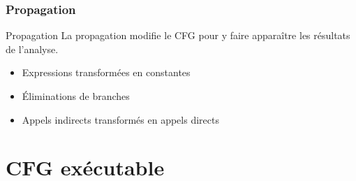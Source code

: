 \documentclass{beamer}
\begin{document}
\subsubsection{Propagation}


\begin{frame}{Propagation}
    La propagation modifie le CFG pour y faire apparaître les résultats de l'analyse.

    \begin{itemize}
        \item Expressions transformées en constantes
        \item Éliminations de branches
        \item Appels indirects transformés en appels directs
    \end{itemize}
\end{frame}

\section{CFG exécutable}
\end{document}
